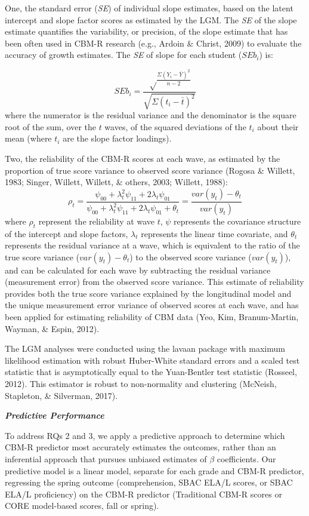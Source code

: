 \documentclass[
  english,
  man, fleqn, noextraspace]{apa6}
\begin{document}
One, the standard error (\emph{SE}) of individual slope estimates, based on the latent intercept and slope factor scores as estimated by the LGM. The \emph{SE} of the slope estimate quantifies the variability, or precision, of the slope estimate that has been often used in CBM-R research (e.g., Ardoin \& Christ, 2009) to evaluate the accuracy of growth estimates. The \emph{SE} of slope for each student (\(SEb_i\)) is:

\[
SEb_i = \frac{\sqrt\frac{\Sigma(Y_i - \bar{Y})^2}{n - 2}}{\sqrt{\Sigma(t_i - \bar{t})^2}}
\]
where the numerator is the residual variance and the denominator is the square root of the sum, over the \(t\) waves, of the squared deviations of the \(t_i\) about their mean (where \(t_i\) are the slope factor loadings).

Two, the reliability of the CBM-R scores at each wave, as estimated by the proportion of true score variance to observed score variance (Rogosa \& Willett, 1983; Singer, Willett, Willett, \& others, 2003; Willett, 1988):
\[
\rho_t = \frac{\psi_{00} + \lambda^2_t \psi_{11} + 2\lambda_t \psi_{01}}{\psi_{00} + \lambda^2_t \psi_{11} + 2\lambda_t \psi_{01} + \theta_t} = \frac{var(y_t) - \theta_t}{var(y_t)}
\]
where \(\rho_t\) represent the reliability at wave \(t\), \(\psi\) represents the covariance structure of the intercept and slope factors, \(\lambda_t\) represents the linear time covariate, and \(\theta_t\) represents the residual variance at a wave, which is equivalent to the ratio of the true score variance (\(var(y_t) - \theta_t\)) to the observed score variance (\(var(y_t)\)), and can be calculated for each wave by subtracting the residual variance (measurement error) from the observed score variance. This estimate of reliability provides both the true score variance explained by the longitudinal model and the unique measurement error variance of observed scores at each wave, and has been applied for estimating reliability of CBM data (Yeo, Kim, Branum-Martin, Wayman, \& Espin, 2012).

The LGM analyses were conducted using the lavaan package with maximum likelihood estimation with robust Huber-White standard errors and a scaled test statistic that is asymptotically equal to the Yuan-Bentler test statistic (Rosseel, 2012). This estimator is robust to non-normality and clustering (McNeish, Stapleton, \& Silverman, 2017).

\textbf{\emph{Predictive Performance}}

To address RQs 2 and 3, we apply a predictive approach to determine which CBM-R predictor most accurately estimates the outcomes, rather than an inferential approach that pursues unbiased estimates of \(\beta\) coefficients. Our predictive model is a linear model, separate for each grade and CBM-R predictor, regressing the spring outcome (comprehension, SBAC ELA/L scores, or SBAC ELA/L proficiency) on the CBM-R predictor (Traditional CBM-R scores or CORE model-based scores, fall or spring).
\end{document}
